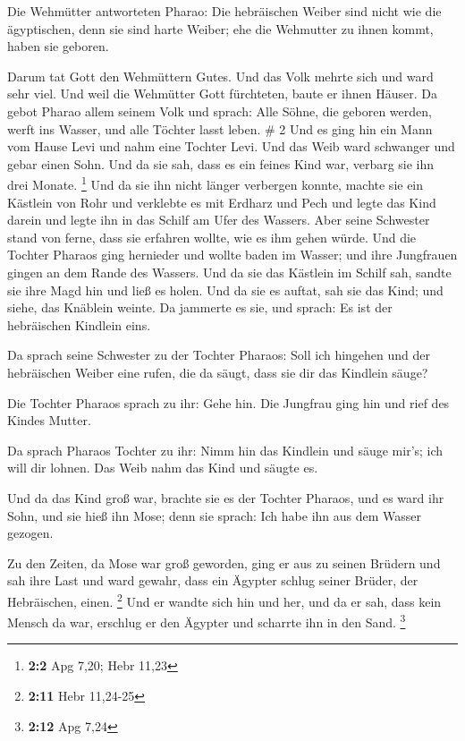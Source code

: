  Die Wehmütter antworteten Pharao: Die hebräischen Weiber
sind nicht wie die ägyptischen, denn sie sind harte Weiber; ehe die
Wehmutter zu ihnen kommt, haben sie geboren.

 Darum tat Gott den Wehmüttern Gutes. Und das Volk mehrte
sich und ward sehr viel.  Und weil die Wehmütter Gott
fürchteten, baute er ihnen Häuser.  Da gebot Pharao allem
seinem Volk und sprach: Alle Söhne, die geboren werden, werft ins
Wasser, und alle Töchter lasst leben. \# 2  Und es ging hin
ein Mann vom Hause Levi und nahm eine Tochter Levi.  Und das
Weib ward schwanger und gebar einen Sohn. Und da sie sah, dass es ein
feines Kind war, verbarg sie ihn drei Monate. \footnote{\textbf{2:2} Apg
  7,20; Hebr 11,23}  Und da sie ihn nicht länger verbergen
konnte, machte sie ein Kästlein von Rohr und verklebte es mit Erdharz
und Pech und legte das Kind darein und legte ihn in das Schilf am Ufer
des Wassers.  Aber seine Schwester stand von ferne, dass sie
erfahren wollte, wie es ihm gehen würde.  Und die Tochter
Pharaos ging hernieder und wollte baden im Wasser; und ihre Jungfrauen
gingen an dem Rande des Wassers. Und da sie das Kästlein im Schilf sah,
sandte sie ihre Magd hin und ließ es holen.  Und da sie es
auftat, sah sie das Kind; und siehe, das Knäblein weinte. Da jammerte es
sie, und sprach: Es ist der hebräischen Kindlein eins.

 Da sprach seine Schwester zu der Tochter Pharaos: Soll ich
hingehen und der hebräischen Weiber eine rufen, die da säugt, dass sie
dir das Kindlein säuge?

 Die Tochter Pharaos sprach zu ihr: Gehe hin. Die Jungfrau
ging hin und rief des Kindes Mutter.

 Da sprach Pharaos Tochter zu ihr: Nimm hin das Kindlein und
säuge mir's; ich will dir lohnen. Das Weib nahm das Kind und säugte es.

 Und da das Kind groß war, brachte sie es der Tochter
Pharaos, und es ward ihr Sohn, und sie hieß ihn Mose; denn sie sprach:
Ich habe ihn aus dem Wasser gezogen.

 Zu den Zeiten, da Mose war groß geworden, ging er aus zu
seinen Brüdern und sah ihre Last und ward gewahr, dass ein Ägypter
schlug seiner Brüder, der Hebräischen, einen. \footnote{\textbf{2:11}
  Hebr 11,24-25}  Und er wandte sich hin und her, und da er
sah, dass kein Mensch da war, erschlug er den Ägypter und scharrte ihn
in den Sand. \footnote{\textbf{2:12} Apg 7,24}


